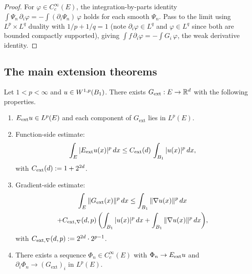\begin{proof}
\leanok
{}

For $\varphi \in C^\infty_c(E)$, the integration-by-parts identity
$\int \Psi_n\, \partial_i \varphi = -\int (\partial_i \Psi_n)\, \varphi$
holds for each smooth $\Psi_n$. Pass to the limit using $L^p \times L^q$
duality with $1/p + 1/q = 1$ (note $\partial_i\varphi \in L^q$ and
$\varphi \in L^q$ since both are bounded compactly supported), giving
$\int f\, \partial_i \varphi = -\int G_i\, \varphi$, the weak derivative
identity.
\end{proof}

\subsection*{The main extension theorems}

\begin{theorem}
\label{thm:global-approx-extension}
\leanok
{}
Let $1 < p < \infty$ and $u \in W^{1,p}(B_{1})$. There exists
$G_{\mathrm{ext}} : E \to \mathbb{R}^d$ with the following properties.
\begin{enumerate}
\item $E_{\mathrm{ext}} u \in L^p(E)$ and each component of $G_{\mathrm{ext}}$ lies in
$L^p(E)$.
\item Function-side estimate:
\begin{equation*}
\int_E |E_{\mathrm{ext}} u(x)|^p\,dx
\le C_{\mathrm{ext}}(d)\,\int_{B_{1}} |u(x)|^p\,dx,
\end{equation*}
with $C_{\mathrm{ext}}(d) := 1 + 2^{2d}$.
\item Gradient-side estimate:
\begin{multline*}
\int_E \|G_{\mathrm{ext}}(x)\|^p\,dx
\le \int_{B_{1}} \|\nabla u(x)\|^p\,dx \\
+ C_{\mathrm{ext},\nabla}(d, p)\,\biggl(\int_{B_{1}} |u(x)|^p\,dx
+ \int_{B_{1}} \|\nabla u(x)\|^p\,dx\biggr),
\end{multline*}
with $C_{\mathrm{ext},\nabla}(d,p) := 2^{2d}\cdot 2^{p-1}$.
\item There exists a sequence $\Phi_n \in C^\infty_c(E)$ with
$\Phi_n \to E_{\mathrm{ext}} u$ and $\partial_i \Phi_n \to (G_{\mathrm{ext}})_i$ in
$L^p(E)$.
\end{enumerate}
\end{theorem}

